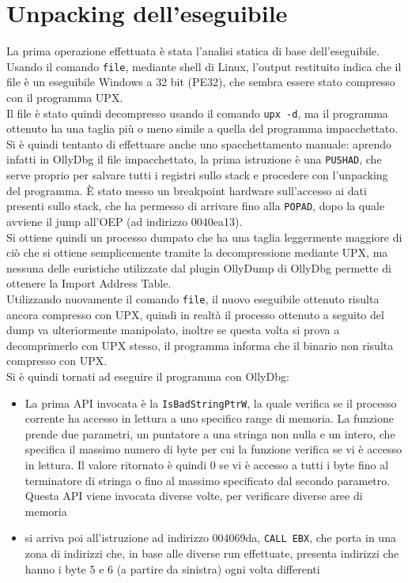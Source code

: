 \documentclass[12pt]{extarticle}
\begin{document}
\section{Unpacking dell'eseguibile}
La prima operazione effettuata è stata l'analisi statica di base dell'eseguibile. Usando il comando \texttt{file}, mediante shell di Linux, l'output restituito indica che il file è un eseguibile Windows a 32 bit (PE32), che sembra essere stato compresso con il programma UPX.\\Il file è stato quindi decompresso usando il comando \texttt{upx -d}, ma il programma ottenuto ha una taglia più o meno simile a quella del programma impacchettato.\\Si è quindi tentanto di effettuare anche uno spacchettamento manuale: aprendo infatti in OllyDbg il file impacchettato, la prima istruzione è una \texttt{PUSHAD}, che serve proprio per salvare tutti i registri sullo stack e procedere con l'unpacking del programma. È stato messo un breakpoint hardware sull'accesso ai dati presenti sullo stack, che ha permesso di arrivare fino alla \texttt{POPAD}, dopo la quale avviene il jump all'OEP (ad indirizzo 0040ea13).\\Si ottiene quindi un processo dumpato che ha una taglia leggermente maggiore di ciò che si ottiene semplicemente tramite la decompressione mediante UPX, ma nessuna delle euristiche utilizzate dal plugin OllyDump di OllyDbg permette di ottenere la Import Address Table.\\Utilizzando nuovamente il comando \texttt{file}, il nuovo eseguibile ottenuto risulta ancora compresso con UPX, quindi in realtà il processo ottenuto a seguito del dump va ulteriormente manipolato, inoltre se questa volta si prova a decomprimerlo con UPX stesso, il programma informa che il binario non risulta compresso con UPX.\\Si è quindi tornati ad eseguire il programma con OllyDbg:
\begin{itemize}
    \item La prima API invocata è la \texttt{IsBadStringPtrW}, la quale verifica se il processo corrente ha accesso in lettura a uno specifico range di memoria. La funzione prende due parametri, un puntatore a una stringa non nulla e un intero, che specifica il massimo numero di byte per cui la funzione verifica se vi è accesso in lettura. Il valore ritornato è quindi 0 se vi è accesso a tutti i byte fino al terminatore di stringa o fino al massimo specificato dal secondo parametro.\\Questa API viene invocata diverse volte, per verificare diverse aree di memoria 
    \item si arriva poi all'istruzione ad indirizzo 004069da, \texttt{CALL EBX}, che porta in una zona di indirizzi che, in base alle diverse run effettuate, presenta indirizzi che hanno i byte 5 e 6 (a partire da sinistra) ogni volta differenti
\end{itemize}
\end{document}
